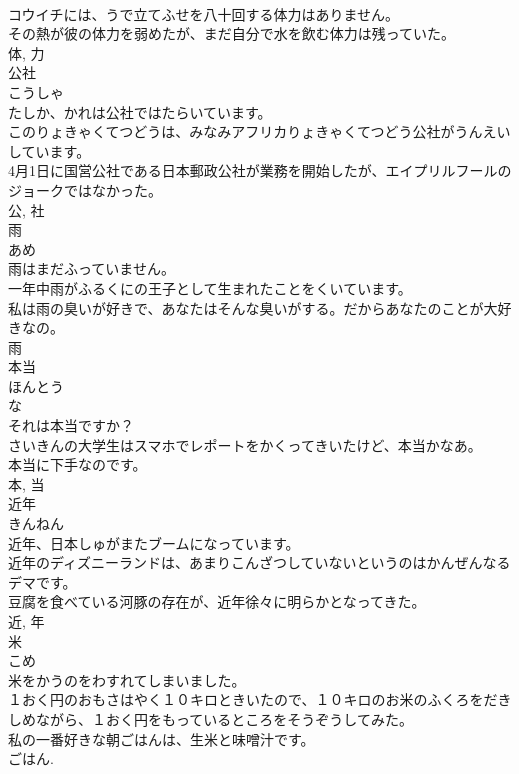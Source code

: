 \documentclass[8pt]{extreport}
\begin{document}
\begin{CJK}{UTF8}{min}
\\	コウイチには、うで立てふせを八十回する体力はありません。	
\\	その熱が彼の体力を弱めたが、まだ自分で水を飲む体力は残っていた。	
\\	体, 力	
\\	公社	
\\	こうしゃ	
\\	たしか、かれは公社ではたらいています。	
\\	このりょきゃくてつどうは、みなみアフリカりょきゃくてつどう公社がうんえいしています。	
\\	4月1日に国営公社である日本郵政公社が業務を開始したが、エイプリルフールのジョークではなかった。	
\\	公, 社	
\\	雨	
\\	あめ	
\\	雨はまだふっていません。	
\\	一年中雨がふるくにの王子として生まれたことをくいています。	
\\	私は雨の臭いが好きで、あなたはそんな臭いがする。だからあなたのことが大好きなの。	
\\	雨	
\\	本当	
\\	ほんとう	
\\	な 
\\	それは本当ですか？	
\\	さいきんの大学生はスマホでレポートをかくってきいたけど、本当かなあ。	
\\	本当に下手なのです。	
\\	本, 当	
\\	近年	
\\	きんねん	
\\	近年、日本しゅがまたブームになっています。	
\\	近年のディズニーランドは、あまりこんざつしていないというのはかんぜんなるデマです。	
\\	豆腐を食べている河豚の存在が、近年徐々に明らかとなってきた。	
\\	近, 年	
\\	米	
\\	こめ	
\\	米をかうのをわすれてしまいました。	
\\	１おく円のおもさはやく１０キロときいたので、１０キロのお米のふくろをだきしめながら、１おく円をもっているところをそうぞうしてみた。	
\\	私の一番好きな朝ごはんは、生米と味噌汁です。	
\\	ごはん. 

\end{CJK}
\end{document}
